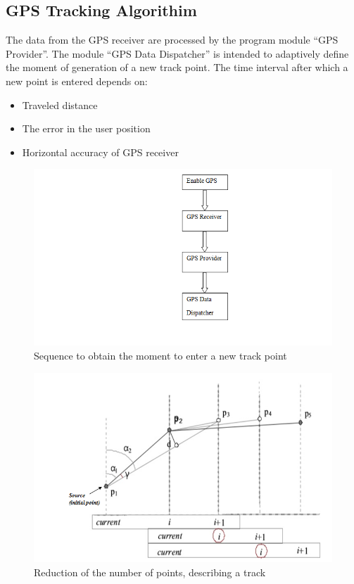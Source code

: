 \documentclass[12pt,a4paper]{article}
\begin{document}
\subsection{GPS Tracking Algorithim}
\hspace{0.7cm}The data from the GPS receiver are processed by the program module “GPS Provider”. The module “GPS Data Dispatcher” is intended to adaptively define the moment of generation of a new track point. The time interval after which a new point is entered depends on: 
\begin{itemize}
\item Traveled distance
\item The error in the user position  
\item Horizontal accuracy of GPS receiver
\end{itemize}

\begin{figure}[!htb]
\centering
\includegraphics[width=10.5 cm]{point}
\caption{Sequence to obtain the moment to enter a new track point}
\end{figure}

\begin{figure}[!htb]
\centering
\includegraphics[width=10.5 cm]{track}
\caption{Reduction of the number of points, describing a track}
\end{figure}
\end{document}
